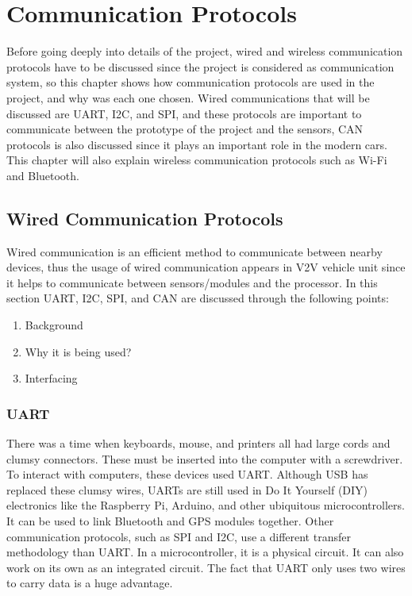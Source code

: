 \chapter{Communication Protocols}
Before going deeply into details of the project, wired and wireless communication protocols have to be discussed since the project is considered as communication system, so this chapter shows how communication protocols are used in the project, and why was each one chosen. Wired communications that will be discussed are UART, I2C, and SPI, and these protocols are important to communicate between the prototype of the project and the sensors, CAN protocols is also discussed since it plays an important role in the modern cars. This chapter will also explain wireless communication protocols such as Wi-Fi and Bluetooth.

\section{Wired Communication Protocols}
Wired communication is an efficient method to communicate between nearby devices, thus the usage of wired communication appears in V2V vehicle unit since it helps to communicate between sensors/modules and the processor.
In this section UART, I2C, SPI, and CAN are discussed through the following points:
\begin{enumerate}
    \item Background
    \item Why it is being used?
    \item Interfacing
\end{enumerate}
\subsection{UART}
There was a time when keyboards, mouse, and printers all had large cords and clumsy connectors. These must be inserted into the computer with a screwdriver. To interact with computers, these devices used UART. Although USB has replaced these clumsy wires, UARTs are still used in Do It Yourself (DIY) electronics like the Raspberry Pi, Arduino, and other ubiquitous microcontrollers. It can be used to link Bluetooth and GPS modules together. \newline
Other communication protocols, such as SPI and I2C, use a different transfer methodology than UART. In a microcontroller, it is a physical circuit. It can also work on its own as an integrated circuit. The fact that UART only uses two wires to carry data is a huge advantage. \clearpage
